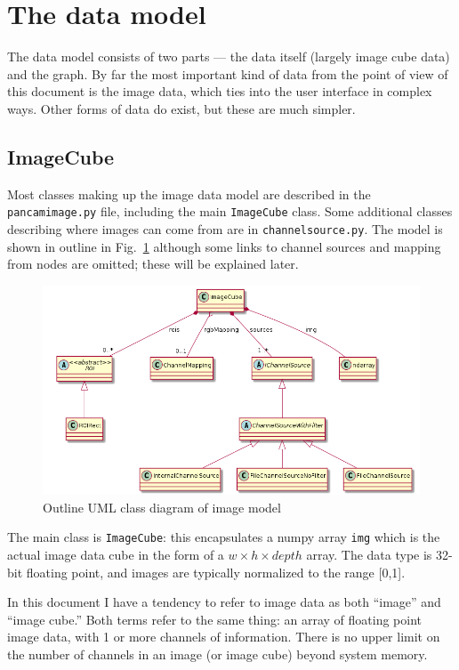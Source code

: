 

\section{The data model}
The data model consists of two parts --- the data itself (largely
image cube data) and the graph. By far the most important kind of data
from the point of view of this document is the image data, which ties
into the user interface in complex ways. Other forms of data do exist,
but these are much simpler.

\subsection{ImageCube}
Most classes making up the image data 
model are described in the \texttt{pancamimage.py} file, including the main \texttt{ImageCube}
class. Some additional classes describing where images can come from are in \texttt{channelsource.py}.
The model is shown in outline in Fig.~\ref{image.png} although some links to channel sources
and mapping from nodes are omitted; these will be explained later.

\begin{figure}[ht]
\center
\includegraphics[width=5in]{image.png}
\caption{Outline UML class diagram of image model}
\label{image.png}
\end{figure}

The main class is \texttt{ImageCube}: this encapsulates a numpy array
\texttt{img}
which is the actual image data cube in the form
of a $w \times h \times depth$ array. The data type is 32-bit floating
point, and images are typically normalized to the range [0,1].

\begin{notebox}
In this document I have a tendency to refer to image data as both ``image'' and ``image cube.''
Both terms refer to the same thing: an array of floating point image data, with 1 or more channels
of information. There is no upper limit on the number of channels in an image (or image cube)
beyond system memory.
\end{notebox}


